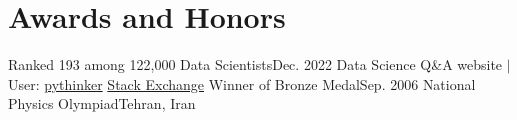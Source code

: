 \section{Awards and Honors}
  \resumeSubHeadingListStart
    \resumeSubheading
      {Ranked 193 among 122,000 Data Scientists}{Dec. 2022}
      {Data Science Q\&A website \(|\)  User: \href{https://datascience.stackexchange.com/users/51209/pythinker}{pythinker}} {\href{https://stackexchange.com/leagues/557/alltime}{Stack Exchange}}
    \resumeSubheading
      {Winner of Bronze Medal}{Sep. 2006}
      {National Physics Olympiad}{Tehran, Iran}
  \resumeSubHeadingListEnd